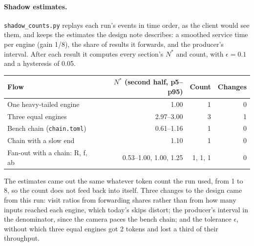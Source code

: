 \documentclass[11pt]{article}
\newcommand{\code}[1]{\texttt{#1}}
\begin{document}
\paragraph{Shadow estimates.} \code{shadow\_counts.py} replays each run's
events in time order, as the client would see them, and keeps the
estimates the design note describes: a smoothed service time per engine (gain 1/8), the share of
results it forwards, and the producer's interval. After each result it
computes every section's $N^*$ and count, with $\epsilon = 0.1$ and a
hysteresis of 0.05.
\begin{center}
\small
\begin{tabular}{@{}lrrr@{}}
\toprule
Flow & $N^*$ (second half, p5--p95) & Count & Changes \\
\midrule
One heavy-tailed engine        & 1.00        & 1 & 0 \\
Three equal engines            & 2.97--3.00  & 3 & 1 \\
Bench chain (\code{chain.toml}) & 0.61--1.16 & 1 & 0 \\
Chain with a slow end          & 1.10        & 1 & 0 \\
Fan-out with a chain: R, f, ab & 0.53--1.00, 1.00, 1.25 & 1, 1, 1 & 0 \\
\bottomrule
\end{tabular}
\end{center}
The estimates came out the same whatever token count the run used, from 1
to 8, so the count does not feed back into itself. Three changes to the
design came from this run: visit ratios from forwarding shares rather than
from how many inputs reached each engine, which today's skips distort; the
producer's interval in the denominator, since the camera paces the bench
chain; and the tolerance $\epsilon$, without which three equal engines got 2
tokens and lost a third of their throughput.
\end{document}

